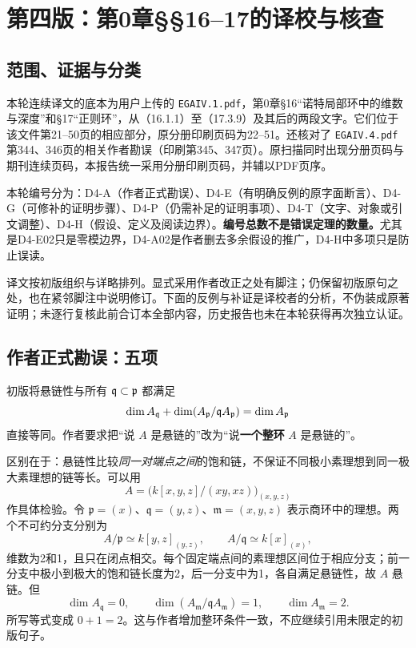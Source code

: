\chapter{第四版：第0章§§16--17的译校与核查}
\section{范围、证据与分类}
本轮连续译文的底本为用户上传的 \texttt{EGAIV.1.pdf}，第0章§16“诺特局部环中的维数与深度”和§17“正则环”，从（16.1.1）至（17.3.9）及其后的两段文字。它们位于该文件第21--50页的相应部分，原分册印刷页码为22--51。还核对了 \texttt{EGAIV.4.pdf} 第344、346页的相关作者勘误（印刷第345、347页）。原扫描同时出现分册页码与期刊连续页码，本报告统一采用分册印刷页码，并辅以PDF页序。

本轮编号分为：D4-A（作者正式勘误）、D4-E（有明确反例的原字面断言）、D4-G（可修补的证明步骤）、D4-P（仍需补足的证明事项）、D4-T（文字、对象或引文调整）、D4-H（假设、定义及阅读边界）。\textbf{编号总数不是错误定理的数量。}尤其是D4-E02只是零模边界，D4-A02是作者删去多余假设的推广，D4-H中多项只是防止误读。

译文按初版组织与详略排列。显式采用作者改正之处有脚注；仍保留初版原句之处，也在紧邻脚注中说明修订。下面的反例与补证是译校者的分析，不伪装成原著证明；未逐行复核此前合订本全部内容，历史报告也未在本轮获得再次独立认证。

\section{作者正式勘误：五项}
初版将悬链性与所有 $\mathfrak q\subset\mathfrak p$ 都满足
\[
 \dim A_{\mathfrak q}+\dim(A_{\mathfrak p}/\mathfrak q A_{\mathfrak p})=\dim A_{\mathfrak p}
\]
直接等同。作者要求把“说 $A$ 是悬链的”改为“说\textbf{一个整环} $A$ 是悬链的”。

区别在于：悬链性比较\emph{同一对端点之间}的饱和链，不保证不同极小素理想到同一极大素理想的链等长。可以用
\[
 A=\bigl(k[x,y,z]/(xy,xz)\bigr)_{(x,y,z)}
\]
作具体检验。令 $\mathfrak p=(x)$、$\mathfrak q=(y,z)$、$\mathfrak m=(x,y,z)$ 表示商环中的理想。两个不可约分支分别为
\[
 A/\mathfrak p\simeq k[y,z]_{(y,z)},\qquad
 A/\mathfrak q\simeq k[x]_{(x)},
\]
维数为2和1，且只在闭点相交。每个固定端点间的素理想区间位于相应分支；前一分支中极小到极大的饱和链长度为2，后一分支中为1，各自满足悬链性，故 $A$ 悬链。但
\[
 \dim A_{\mathfrak q}=0,\qquad
 \dim(A_{\mathfrak m}/\mathfrak qA_{\mathfrak m})=1,
 \qquad\dim A_{\mathfrak m}=2.
\]
所写等式变成 $0+1=2$。这与作者增加整环条件一致，不应继续引用未限定的初版句子。

